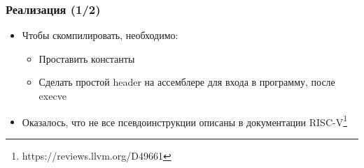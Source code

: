 \documentclass{beamer}
\begin{document}
\begin{frame}[fragile]
  \frametitle{Реализация (1/2)}
  \begin{itemize}
    \item Чтобы скомпилировать, необходимо:
          \begin{itemize}
            \item Проставить константы
            \item Сделать простой header на ассемблере для входа в программу, после execve
          \end{itemize}
    \item Оказалось, что не все псевдоинструкции описаны в документации RISC-V\footnote{https://reviews.llvm.org/D49661}
  \end{itemize}
\end{frame}
\end{document}
